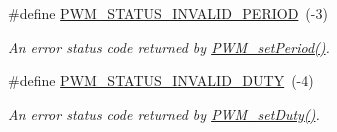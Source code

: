 \begin{DoxyCompactItemize}
\#define \hyperlink{_p_w_m_8h_a5541b99566b02450b1d44b3bf0c344bc}{P\+W\+M\+\_\+\+S\+T\+A\+T\+U\+S\+\_\+\+I\+N\+V\+A\+L\+I\+D\+\_\+\+P\+E\+R\+I\+O\+D}~(-\/3)
\begin{DoxyCompactList}\small\item\em An error status code returned by \hyperlink{_p_w_m_8h_ae40714354f46dd6d30dbfb14473c73e0}{P\+W\+M\+\_\+set\+Period()}. \end{DoxyCompactList}\item 
\#define \hyperlink{_p_w_m_8h_ac3b90551ab071520eccaabe4cabe1f1a}{P\+W\+M\+\_\+\+S\+T\+A\+T\+U\+S\+\_\+\+I\+N\+V\+A\+L\+I\+D\+\_\+\+D\+U\+T\+Y}~(-\/4)
\begin{DoxyCompactList}\small\item\em An error status code returned by \hyperlink{_p_w_m_8h_a90979a3b8d525f266c2b82e012f68cee}{P\+W\+M\+\_\+set\+Duty()}. \end{DoxyCompactList}\end{DoxyCompactItemize}
